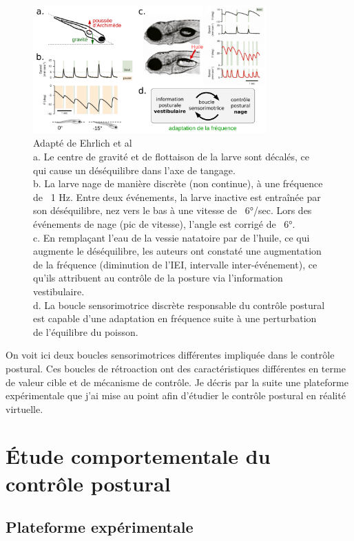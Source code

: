 \begin{figure}
\centering
\includegraphics[width=0.8\textwidth]{./files/schoppik_movement-initiation.svg.png}
\caption{Adapté de Ehrlich et al \cite{ehrlich_control_2017}
\\
a. Le centre de gravité et de flottaison de la larve sont décalés, ce qui cause un déséquilibre dans l'axe de tangage.
\\
b. La larve nage de manière discrète (non continue), à une fréquence de ~1 Hz. Entre deux événements, la larve inactive est entraînée par son déséquilibre, nez vers le bas à une vitesse de ~6°/sec. Lors des événements de nage (pic de vitesse), l'angle est corrigé de ~6°.
\\
c. En remplaçant l'eau de la vessie natatoire par de l'huile, ce qui augmente le déséquilibre, les auteurs ont constaté une augmentation de la fréquence (diminution de l'IEI, intervalle inter-événement), ce qu'ils attribuent au contrôle de la posture via l'information vestibulaire.
\\
d. La boucle sensorimotrice discrète responsable du contrôle postural est capable d'une adaptation en fréquence suite à une perturbation de l'équilibre du poisson.}
\end{figure}

On voit ici deux boucles sensorimotrices différentes impliquée dans le contrôle postural. Ces boucles de rétroaction ont des caractéristiques différentes en terme de valeur cible et de mécanisme de contrôle. Je décris par la suite une plateforme expérimentale que j'ai mise au point afin d'étudier le contrôle postural en réalité virtuelle.

\section{Étude comportementale du contrôle postural}

\subsection{Plateforme expérimentale}

